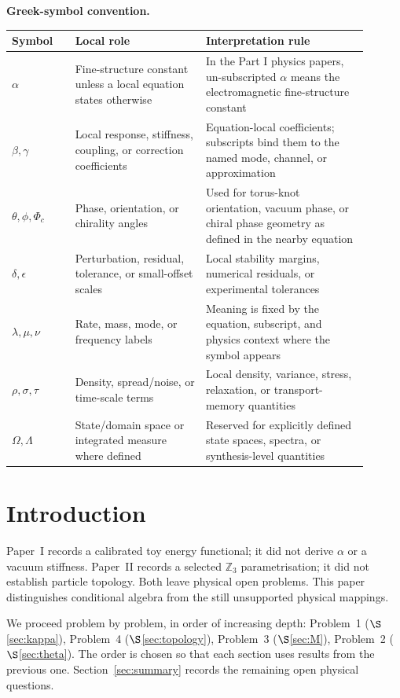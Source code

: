 \documentclass[11pt]{article}
\begin{document}
\noindent\textbf{Greek-symbol convention.}
\begin{center}
{\small
\begin{tabular}{p{0.16\linewidth}p{0.33\linewidth}p{0.41\linewidth}}
\hline
Symbol & Local role & Interpretation rule \\
\hline
$\alpha$ & Fine-structure constant unless a local equation states otherwise & In the Part I physics papers, un-subscripted $\alpha$ means the electromagnetic fine-structure constant \\
$\beta,\gamma$ & Local response, stiffness, coupling, or correction coefficients & Equation-local coefficients; subscripts bind them to the named mode, channel, or approximation \\
$\theta,\phi,\Phi_c$ & Phase, orientation, or chirality angles & Used for torus-knot orientation, vacuum phase, or chiral phase geometry as defined in the nearby equation \\
$\delta,\epsilon$ & Perturbation, residual, tolerance, or small-offset scales & Local stability margins, numerical residuals, or experimental tolerances \\
$\lambda,\mu,\nu$ & Rate, mass, mode, or frequency labels & Meaning is fixed by the equation, subscript, and physics context where the symbol appears \\
$\rho,\sigma,\tau$ & Density, spread/noise, or time-scale terms & Local density, variance, stress, relaxation, or transport-memory quantities \\
$\Omega,\Lambda$ & State/domain space or integrated measure where defined & Reserved for explicitly defined state spaces, spectra, or synthesis-level quantities \\
\hline
\end{tabular}
}
\end{center}


\section{Introduction}

Paper~I records a calibrated toy energy functional; it did not derive
$\alpha$ or a vacuum stiffness. Paper~II records a selected $\mathbb{Z}_3$
parametrisation; it did not establish particle topology. Both leave physical
open problems. This paper distinguishes conditional algebra from the still
unsupported physical mappings.

We proceed problem by problem, in order of increasing depth:
Problem~1 ($\S$\ref{sec:kappa}), Problem~4 ($\S$\ref{sec:topology}),
Problem~3 ($\S$\ref{sec:M}), Problem~2 ($\S$\ref{sec:theta}).
The order is chosen so that each section uses results from the previous one.
Section~\ref{sec:summary} records the remaining open physical questions.
\end{document}
